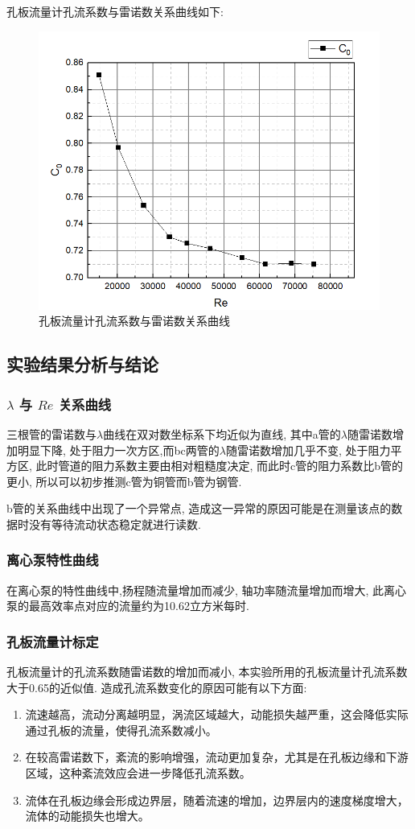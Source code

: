 \documentclass[a4paper,UTF8]{ctexrep}
\theoremstyle{plain}
\theoremstyle{definition}
\numberwithin{equation}{chapter}
\begin{document}
\newpage
孔板流量计孔流系数与雷诺数关系曲线如下:

\begin{figure}
    \centering
    \includegraphics[width=0.7\linewidth]{n.png}
    \caption{孔板流量计孔流系数与雷诺数关系曲线}
    \label{fig:enter-label}
\end{figure}

\subsection{实验结果分析与结论}
\subsubsection{$\lambda$ 与 $Re$ 关系曲线}
三根管的雷诺数与$\lambda$曲线在双对数坐标系下均近似为直线, 其中a管的$\lambda$随雷诺数增加明显下降, 处于阻力一次方区,而bc两管的$\lambda$随雷诺数增加几乎不变, 处于阻力平方区, 此时管道的阻力系数主要由相对粗糙度决定, 而此时c管的阻力系数比b管的更小, 所以可以初步推测c管为铜管而b管为钢管.

b管的关系曲线中出现了一个异常点, 造成这一异常的原因可能是在测量该点的数据时没有等待流动状态稳定就进行读数.

\subsubsection{离心泵特性曲线}
在离心泵的特性曲线中,扬程随流量增加而减少, 轴功率随流量增加而增大, 此离心泵的最高效率点对应的流量约为10.62立方米每时.
\subsubsection{孔板流量计标定}
孔板流量计的孔流系数随雷诺数的增加而减小, 本实验所用的孔板流量计孔流系数大于0.65的近似值. 造成孔流系数变化的原因可能有以下方面:
\begin{enumerate}
    \item 流速越高，流动分离越明显，涡流区域越大，动能损失越严重，这会降低实际通过孔板的流量，使得孔流系数减小。
    \item 在较高雷诺数下，紊流的影响增强，流动更加复杂，尤其是在孔板边缘和下游区域，这种紊流效应会进一步降低孔流系数。
    \item 流体在孔板边缘会形成边界层，随着流速的增加，边界层内的速度梯度增大，流体的动能损失也增大。
\end{enumerate}
\end{document}
